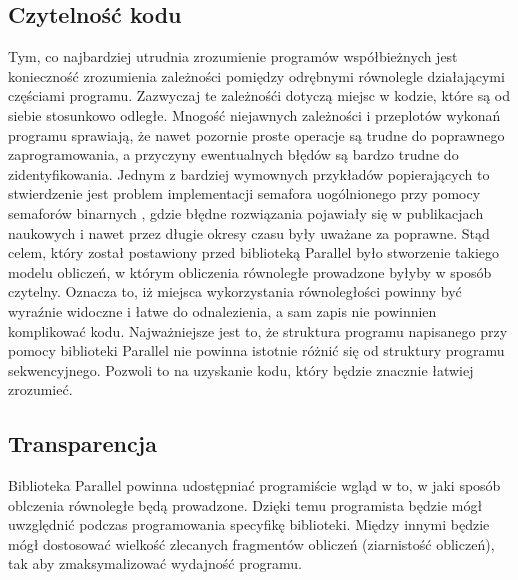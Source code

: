 \subsection{Czytelność kodu}

  Tym, co najbardziej utrudnia zrozumienie programów współbieżnych jest konieczność zrozumienia zależności pomiędzy odrębnymi równolegle działającymi częściami programu.
  Zazwyczaj te zależnośći dotyczą miejsc w kodzie, które są od siebie stosunkowo odległe.
  Mnogość niejawnych zależności i przeplotów wykonań programu sprawiają, że nawet pozornie proste operacje są trudne do poprawnego zaprogramowania, a przyczyny ewentualnych błędów są bardzo trudne do zidentyfikowania.
  Jednym z bardziej wymownych przykładów popierających to stwierdzenie jest problem implementacji semafora uogólnionego przy pomocy semaforów binarnych \cite{gensem}, gdzie błędne rozwiązania pojawiały się w publikacjach naukowych i nawet przez długie okresy czasu były uważane za poprawne.
  Stąd celem, który został postawiony przed biblioteką Parallel było stworzenie takiego modelu obliczeń, w którym obliczenia równoległe prowadzone byłyby w sposób czytelny.
  Oznacza to, iż miejsca wykorzystania równoległości powinny być wyraźnie widoczne i łatwe do odnalezienia, a sam zapis nie powinnien komplikować kodu.
  Najważniejsze jest to, że struktura programu napisanego przy pomocy biblioteki Parallel nie powinna istotnie różnić się od struktury programu sekwencyjnego.
  Pozwoli to na uzyskanie kodu, który będzie znacznie łatwiej zrozumieć.

\subsection{Transparencja}

  Biblioteka Parallel powinna udostępniać programiście wgląd w to, w jaki sposób oblczenia równoległe będą prowadzone.
  Dzięki temu programista będzie mógł uwzględnić podczas programowania specyfikę biblioteki.
  Między innymi będzie mógł dostosować wielkość zlecanych fragmentów obliczeń (ziarnistość obliczeń), tak aby zmaksymalizować wydajność programu.
  
% 


